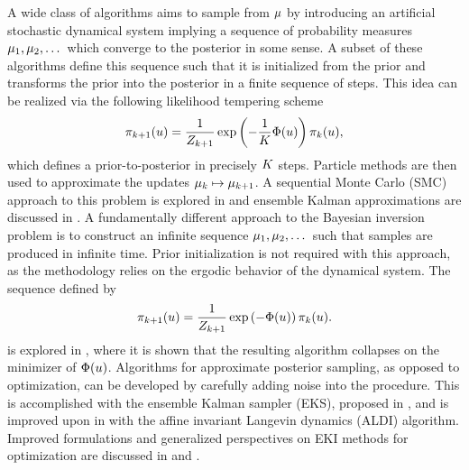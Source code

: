\documentclass[12pt]{article}
\begin{document}
A wide class of algorithms aims to sample from $\mu$ by introducing an artificial stochastic dynamical system 
implying a sequence of probability measures $\mu_1, \mu_2, \dots$ which converge to the posterior in 
some sense. A subset of these algorithms define this sequence such that it is initialized from the prior and transforms the 
prior into the posterior in a finite sequence of steps. This idea can be realized via the following likelihood tempering 
scheme 
\begin{align*}
\pi_{k+1}(u) = \frac{1}{Z_{k+1}} \exp\left(-\frac{1}{K} \Phi(u) \right) \pi_{k}(u),
\end{align*}
which defines a prior-to-posterior in precisely $K$ steps. Particle methods are then used to approximate the updates
$\mu_k \mapsto \mu_{k+1}$. A sequential Monte Carlo (SMC) approach to this problem is explored in \cite{Kantas} 
and ensemble Kalman approximations are discussed in \cite{Iglesias}. A fundamentally different approach to the Bayesian inversion problem is to 
construct an infinite sequence $\mu_1, \mu_2, \dots$ such that samples are produced in infinite time. Prior initialization is not required 
with this approach, as the methodology relies on the ergodic behavior of the dynamical system. The sequence defined by 
\begin{align}
\pi_{k+1}(u) = \frac{1}{Z_{k+1}} \exp\left(-\Phi(u) \right) \pi_{k}(u). 
\end{align}
is explored in \cite{Huang}, where it is shown that the resulting algorithm collapses on the minimizer of $\Phi(u)$. Algorithms for approximate posterior sampling, as opposed
to optimization, can be developed by carefully adding noise into the procedure. This is accomplished with the ensemble Kalman sampler (EKS), proposed in 
\cite{Garbuno}, and is improved upon in \cite{Garbuno2} with the affine invariant Langevin dynamics (ALDI) algorithm. Improved formulations and generalized 
perspectives on EKI methods for optimization are discussed in \cite{Huang} and \cite{Chada}. 

\end{document}
